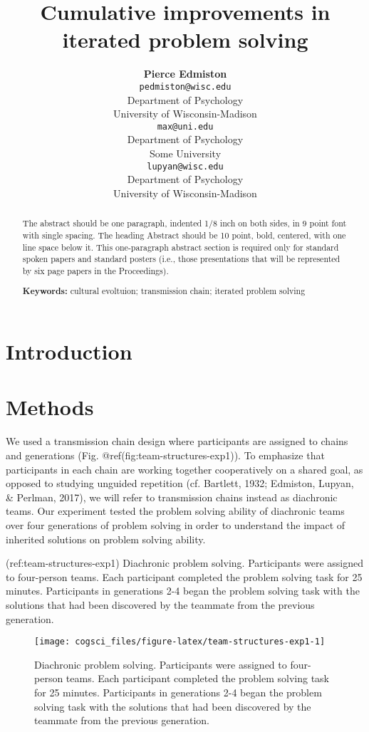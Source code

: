 \documentclass[10pt, letterpaper]{article}
\title{Cumulative improvements in iterated problem solving}
\author{{\large \bf Pierce Edmiston} \\ \texttt{pedmiston@wisc.edu} \\ Department of Psychology \\ University of Wisconsin-Madison
\And {\large \bf Maxime Derex} \\ \texttt{max@uni.edu} \\ Department of Psychology \\ Some University
\And {\large \bf Gary Lupyan} \\ \texttt{lupyan@wisc.edu} \\ Department of Psychology \\ University of Wisconsin-Madison}
\newenvironment{CodeChunk}{}{}
\begin{document}
\maketitle

\begin{abstract}
The abstract should be one paragraph, indented 1/8 inch on both sides,
in 9 point font with single spacing. The heading Abstract should be 10
point, bold, centered, with one line space below it. This one-paragraph
abstract section is required only for standard spoken papers and
standard posters (i.e., those presentations that will be represented by
six page papers in the Proceedings).

\textbf{Keywords:}
cultural evoltuion; transmission chain; iterated problem solving
\end{abstract}

\hypertarget{introduction}{%
\section{Introduction}\label{introduction}}

\hypertarget{methods}{%
\section{Methods}\label{methods}}

We used a transmission chain design where participants are assigned to
chains and generations (Fig. @ref(fig:team-structures-exp1)). To
emphasize that participants in each chain are working together
cooperatively on a shared goal, as opposed to studying unguided
repetition (cf. Bartlett, 1932; Edmiston, Lupyan, \& Perlman, 2017), we
will refer to transmission chains instead as diachronic teams. Our
experiment tested the problem solving ability of diachronic teams over
four generations of problem solving in order to understand the impact of
inherited solutions on problem solving ability.

(ref:team-structures-exp1) Diachronic problem solving. Participants were
assigned to four-person teams. Each participant completed the problem
solving task for 25 minutes. Participants in generations 2-4 began the
problem solving task with the solutions that had been discovered by the
teammate from the previous generation.

\begin{CodeChunk}
\begin{figure*}[h!]

{\centering \texttt{[image: cogsci\_files/figure-latex/team-structures-exp1-1]} 

}

\caption[Diachronic problem solving]{Diachronic problem solving. Participants were assigned to four-person teams. Each participant completed the problem solving task for 25 minutes. Participants in generations 2-4 began the problem solving task with the solutions that had been discovered by the teammate from the previous generation.}\label{fig:team-structures-exp1}
\end{figure*}
\end{CodeChunk}
\end{document}
